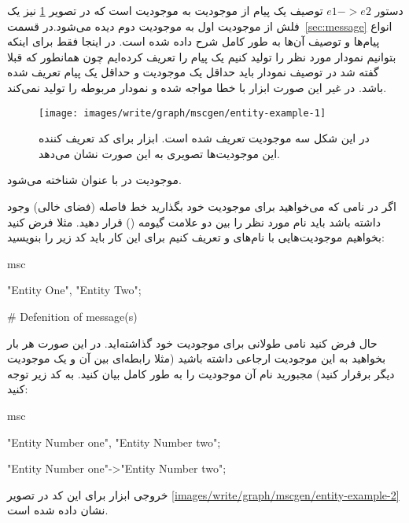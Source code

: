 \begin{note}
دستور $e1->e2$ توصیف یک پیام از موجودیت  به موجودیت  است که در 
تصویر \ref{images/write/graph/mscgen/entity-example-1} نیز یک فلش از موجودیت اول
به موجودیت دوم دیده می‌شود.در قسمت~\ref{sec:message} انواع پیام‌ها و توصیف آن‌ها
به طور کامل شرح داده شده است.
در اینجا فقط برای اینکه بتوانیم نمودار مورد نظر را تولید کنیم یک پیام را تعریف کرده‌ایم
چون همانطور که قبلا گفته شد در توصیف نمودار باید حداقل یک موجودیت و حداقل یک پیام تعریف شده باشد.
در غیر این صورت ابزار  با خطا مواجه شده و نمودار مربوطه را تولید نمی‌کند.
\end{note}

\begin{figure}[h]
	\centering
	\texttt{[image: images/write/graph/mscgen/entity-example-1]}
	\caption[مثالی از نحوه نمایش موجودیت‌ها توسط ابزار ]
	{در این شکل سه موجودیت تعریف شده است. ابزار  برای کد تعریف کننده این موجودیت‌ها 
	تصویری به این صورت نشان می‌دهد.}
	\label{images/write/graph/mscgen/entity-example-1}
\end{figure}

\begin{note}
موجودیت در  با عنوان  شناخته می‌شود.
\end{note}

اگر در نامی که می‌خواهید برای موجودیت خود بگذارید خط فاصله (فضای خالی) وجود
داشته باشد باید نام مورد نظر را بین دو علامت گیومه () قرار دهید. مثلا فرض
کنید بخواهیم موجودیت‌هایی با نام‌های  و  تعریف
کنیم برای این کار باید کد زیر را بنویسید:

\begin{MSC}
msc {
	"Entity One", "Entity Two";
	
	# Defenition of message(s)
}
\end{MSC}

حال فرض کنید نامی طولانی برای موجودیت خود گذاشته‌اید. در این صورت هر بار بخواهید
به این موجودیت ارجاعی داشته باشید (مثلا رابطه‌ای بین آن و یک موجودیت دیگر برقرار
کنید) مجبورید نام آن موجودیت را به طور کامل بیان کنید. به کد زیر توجه کنید:

\begin{MSC}
msc {
	"Entity Number one", "Entity Number two";
	
	"Entity Number one"->"Entity Number two";
}
\end{MSC}

خروجی ابزار  برای این کد در تصویر
\ref{images/write/graph/mscgen/entity-example-2} نشان داده شده است.

